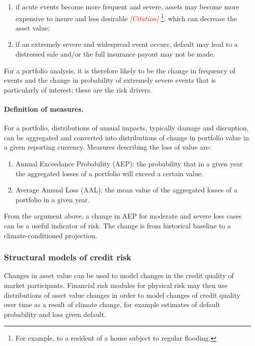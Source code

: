 \documentclass[a4paper,11pt]{extarticle} %
\begin{document}
\begin{enumerate}
    \item if acute events become more frequent and severe, assets may become more expensive to insure and less desirable {\textcolor{red}{\emph{[Citation]}}} \footnote{For example, to a resident of a house subject to regular flooding.}, which can decrease the asset value;
    \item if an extremely severe and widespread event occurs, default may lead to a distressed sale and/or the full insurance payout may not be made.
\end{enumerate}

For a portfolio analysis, it is therefore likely to be the change in frequency of events and the change in probability of extremely severe events that is particularly of interest; these are the risk drivers.

\paragraph{Definition of measures.} For a portfolio, distributions of annual impacts, typically damage and disruption, can be aggregated and converted into distributions of change in portfolio value in a given reporting currency. Measures describing the loss of value are:

\begin{enumerate}
    \item Annual Exceedance Probability (AEP): the probability that in a given year the aggregated losses of a portfolio will exceed a certain value.
    \item Average Annual Loss (AAL): the mean value of the aggregated losses of a portfolio in a given year.
\end{enumerate}

From the argument above, a change in AEP for moderate and severe loss cases can be a useful indicator of risk. The change is from historical baseline to a climate-conditioned projection.

\subsubsection{Structural models of credit risk}
Changes in asset value can be used to model changes in the credit quality of market participants. Financial risk modules for physical risk may then use distributions of asset value changes in order to model changes of credit quality over time as a result of climate change, for example estimates of default probability and loss given default.
\end{document}
